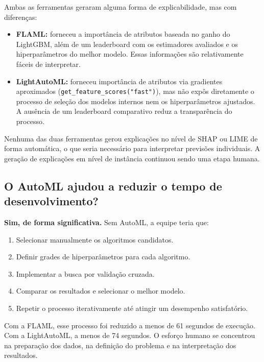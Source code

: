 \documentclass[11pt, a4paper, oneside]{article}
\begin{document}
Ambas as ferramentas geraram alguma forma de explicabilidade, mas com diferenças:

\begin{itemize}[leftmargin=1.5cm, itemsep=4pt]
  \item \textbf{FLAML:} forneceu a importância de atributos baseada no ganho do LightGBM, além de um leaderboard com os estimadores avaliados e os hiperparâmetros do melhor modelo. Essas informações são relativamente fáceis de interpretar.
  \item \textbf{LightAutoML:} forneceu importância de atributos via gradientes aproximados (\texttt{get\_feature\_scores("fast")}), mas não expôs diretamente o processo de seleção dos modelos internos nem os hiperparâmetros ajustados. A ausência de um leaderboard comparativo reduz a transparência do processo.
\end{itemize}

Nenhuma das duas ferramentas gerou explicações no nível de SHAP ou LIME de forma
automática, o que seria necessário para interpretar previsões individuais. A geração
de explicações em nível de instância continuou sendo uma etapa humana.

\subsection{O AutoML ajudou a reduzir o tempo de desenvolvimento?}
\label{sec:tempo}

\textbf{Sim, de forma significativa.} Sem AutoML, a equipe teria que:

\begin{enumerate}[leftmargin=1.5cm, itemsep=4pt]
  \item Selecionar manualmente os algoritmos candidatos.
  \item Definir grades de hiperparâmetros para cada algoritmo.
  \item Implementar a busca por validação cruzada.
  \item Comparar os resultados e selecionar o melhor modelo.
  \item Repetir o processo iterativamente até atingir um desempenho satisfatório.
\end{enumerate}

Com a FLAML, esse processo foi reduzido a menos de 61 segundos de execução. Com a
LightAutoML, a menos de 74 segundos. O esforço humano se concentrou na preparação
dos dados, na definição do problema e na interpretação dos resultados.
\end{document}

